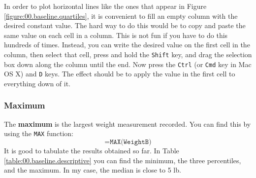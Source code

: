 In order to plot horizontal lines like the ones that appear in Figure \ref{figure:00.baseline.quartiles}, it is convenient to fill an empty column with the desired constant value. The hard way to do this would be to copy and paste the same value on each cell in a column. This is not fun if you have to do this hundreds of times. Instead, you can write the desired value on the first cell in the column, then select that cell, press and hold the \texttt{Shift} key, and drag the selection box down along the column until the end. Now press the \texttt{Ctrl} (or \texttt{Cmd} key in Mac OS X) and \texttt{D} keys. The effect should be to apply the value in the first cell to everything down of it.
\subsubsection{Maximum}
The \textbf{maximum} is the largest weight measurement recorded. You can find this by using the \texttt{MAX} function:
\begin{equation}
    \texttt{=MAX(WeightB)}
\end{equation}
It is good to tabulate the results obtained so far. In Table \ref{table:00.baseline.descriptive} you can find the minimum, the three percentiles, and the maximum. In my case, the median is close to 5 lb.
\begin{center}
\end{center}
